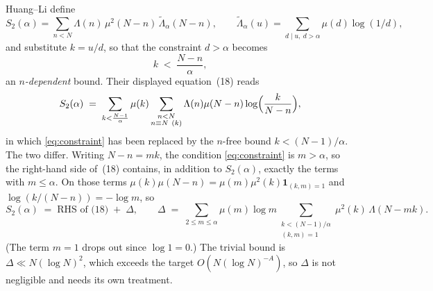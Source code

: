 \documentclass[11pt,a4paper]{article}
\theoremstyle{plain}
\theoremstyle{definition}
\theoremstyle{remark}
\begin{document}
Huang--Li define
\[
  S_2(\alpha)=\sum_{n<N}\Lambda(n)\,\mu^2(N-n)\,
     \tilde\Lambda_\alpha(N-n),
  \qquad
  \tilde\Lambda_\alpha(u)=\sum_{d\mid u,\ d>\alpha}\mu(d)\log(1/d),
\]
and substitute $k=u/d$, so that the constraint $d>\alpha$ becomes
\begin{equation}\label{eq:constraint}
  k\;<\;\frac{N-n}{\alpha},
\end{equation}
an \emph{$n$-dependent} bound. Their displayed equation~(18) reads
\[
  S_2(\alpha)\;=\;\sum_{k<\frac{N-1}{\alpha}}\mu(k)
    \sum_{\substack{n<N\\ n\equiv N\ (k)}}
    \Lambda(n)\mu(N-n)\log\Bigl(\frac{k}{N-n}\Bigr),
\]
in which \eqref{eq:constraint} has been replaced by the $n$-free bound
$k<(N-1)/\alpha$. The two differ. Writing $N-n=mk$, the condition
\eqref{eq:constraint} is $m>\alpha$, so the right-hand side of~(18)
contains, in addition to $S_2(\alpha)$, exactly the terms with
$m\le\alpha$. On those terms
$\mu(k)\mu(N-n)=\mu(m)\mu^2(k)\mathbf 1_{(k,m)=1}$ and
$\log(k/(N-n))=-\log m$, so
\begin{equation}\label{eq:Delta}
  S_2(\alpha)\;=\;\text{RHS of (18)}\;+\;\Delta,
  \qquad
  \Delta\;=\;\sum_{2\le m\le\alpha}\mu(m)\log m
    \sum_{\substack{k<(N-1)/\alpha\\ (k,m)=1}}\mu^2(k)\,\Lambda(N-mk).
\end{equation}
(The term $m=1$ drops out since $\log1=0$.) The trivial bound is
$\Delta\ll N(\log N)^2$, which exceeds the target
$O(N(\log N)^{-A})$, so $\Delta$ is not negligible and needs its own
treatment.
\end{document}
